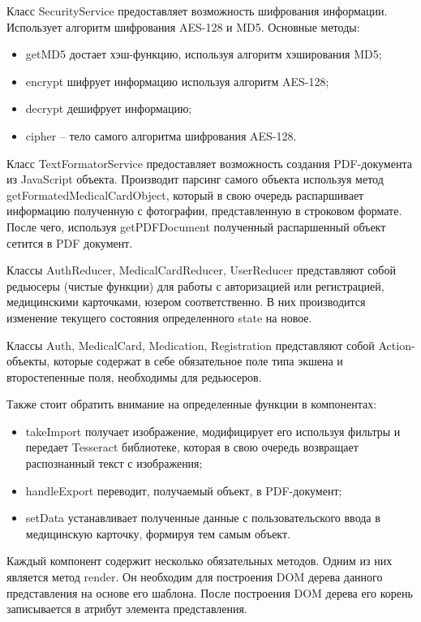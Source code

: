 Класс SecurityService предоставляет возможность шифрования информации. Использует алгоритм шифрования AES-128 и MD5. Основные методы:
\begin{itemize}
  \item getMD5 достает хэш-функцию, используя алгоритм хэширования MD5;
  \item encrypt шифрует информацию используя алгоритм AES-128;
  \item decrypt дешифрует информацию;
  \item cipher -- тело самого алгоритма шифрования AES-128.
\end{itemize}

Класс TextFormatorService предоставляет возможность создания PDF-документа из JavaScript объекта. Производит парсинг самого объекта используя метод getFormatedMedicalCardObject, который в свою очередь распаршивает информацию полученную с фотографии, представленную в строковом формате. После чего, используя getPDFDocument полученный распаршенный объект сетится в PDF документ.

Классы AuthReducer, MedicalCardReducer, UserReducer представляют собой редьюсеры (чистые функции) для работы с авторизацией или регистрацией, медицинскими карточками, юзером соответственно. В них производится изменение текущего состояния определенного state на новое.

Классы Auth, MedicalCard, Medication, Registration представляют собой Action-объекты, которые содержат в себе обязательное поле типа экшена и второстепенные поля, необходимы для редьюсеров.

Также стоит обратить внимание на определенные функции в компонентах:
\begin{itemize}
  \item takeImport получает изображение, модифицирует его используя фильтры и передает Tesseract библиотеке, которая в свою очередь возвращает распознанный текст с изображения;
  \item handleExport переводит, получаемый объект, в PDF-документ;
  \item setData устанавливает полученные данные с пользовательского ввода в медицинскую карточку, формируя тем самым объект.
\end{itemize}

Каждый компонент содержит несколько обязательных методов. Одним из них является метод render. Он необходим для построения DOM дерева данного представления на основе его шаблона. После построения DOM дерева его корень записывается в атрибут элемента представления.

